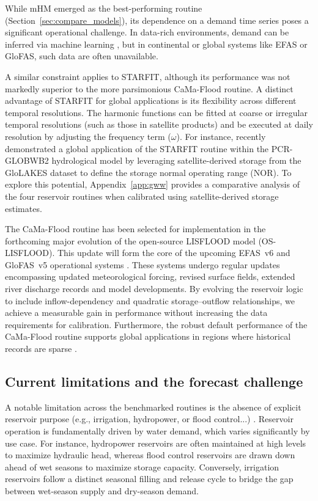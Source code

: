 \documentclass[hess, manuscript]{copernicus}
\begin{document}
While mHM emerged as the best-performing routine (Section~\ref{sec:compare_models}), its dependence on a demand time series poses a significant operational challenge. In data-rich environments, demand can be inferred via machine learning \citep{Shrestha2024}, but in continental or global systems like EFAS or GloFAS, such data are often unavailable. 

A similar constraint applies to STARFIT, although its performance was not markedly superior to the more parsimonious CaMa-Flood routine. A distinct advantage of STARFIT for global applications is its flexibility across different temporal resolutions. The harmonic functions can be fitted at coarse or irregular temporal resolutions (such as those in satellite products) and be executed at daily resolution by adjusting the frequency term ($\omega$). For instance, \citet{Steyaert2025} recently demonstrated a global application of the STARFIT routine within the PCR-GLOBWB2 hydrological model by leveraging satellite-derived storage from the GloLAKES dataset \citep{Hou2024} to define the storage normal operating range (NOR). To explore this potential, Appendix~\ref{app:gww} provides a comparative analysis of the four reservoir routines when calibrated using satellite-derived storage estimates.

The CaMa-Flood routine has been selected for implementation in the forthcoming major evolution of the open-source LISFLOOD model (OS-LISFLOOD). This update will form the core of the upcoming EFAS~v6 and GloFAS~v5 operational systems \citep{Salamon2025}. These systems undergo regular updates encompassing updated meteorological forcing, revised surface fields, extended river discharge records and model developments. By evolving the reservoir logic to include inflow-dependency and quadratic storage--outflow relationships, we achieve a measurable gain in performance without increasing the data requirements for calibration. Furthermore, the robust default performance of the CaMa-Flood routine supports global applications in regions where historical records are sparse \citep{Hanazaki2022}.

\subsection{Current limitations and the forecast challenge}
\label{sec:limitations}

A notable limitation across the benchmarked routines is the absence of explicit reservoir purpose (e.g., irrigation, hydropower, or flood control...) \citep{Shen2025}. Reservoir operation is fundamentally driven by water demand, which varies significantly by use case. For instance, hydropower reservoirs are often maintained at high levels to maximize hydraulic head, whereas flood control reservoirs are drawn down ahead of wet seasons to maximize storage capacity. Conversely, irrigation reservoirs follow a distinct seasonal filling and release cycle to bridge the gap between wet-season supply and dry-season demand. 
\end{document}
